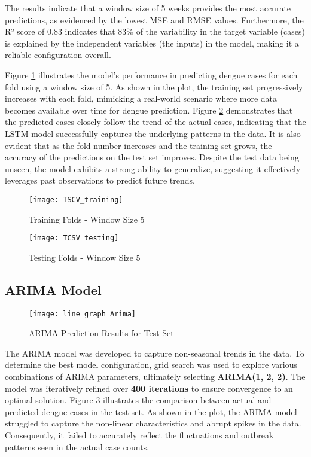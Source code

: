 The results indicate that a window size of 5 weeks provides the most accurate predictions, as evidenced by the lowest MSE and RMSE values. Furthermore, the R² score of 0.83 indicates that 83\% of the variability in the target variable (cases) is explained by the independent variables (the inputs) in the model, making it a reliable configuration overall.

Figure \ref{fig:tcsv_training} illustrates the model’s performance in predicting dengue cases for each fold using a window size of 5. As shown in the plot, the training set progressively increases with each fold, mimicking a real-world scenario where more data becomes available over time for dengue prediction. Figure \ref{fig:tcsv_testing} demonstrates that the predicted cases closely follow the trend of the actual cases, indicating that the LSTM model successfully captures the underlying patterns in the data. It is also evident that as the fold number increases and the training set grows, the accuracy of the predictions on the test set improves. Despite the test data being unseen, the model exhibits a strong ability to generalize, suggesting it effectively leverages past observations to predict future trends.

\begin{figure}[H]
	\centering
	\texttt{[image: TSCV\_training]}
	\caption{Training Folds - Window Size 5}
	\label{fig:tcsv_training}
\end{figure}

\begin{figure}[H]
	\centering
	\texttt{[image: TCSV\_testing]}
	\caption{Testing Folds - Window Size 5}
	\label{fig:tcsv_testing}
\end{figure}

\subsection{ARIMA Model}



\begin{figure}[H]
	\centering
	\texttt{[image: line\_graph\_Arima]}
	\caption{ARIMA Prediction Results for Test Set}
	\label{fig:Arima_result}
\end{figure}

The ARIMA model was developed to capture non-seasonal trends in the data. To determine the best model configuration, grid search was used to explore various combinations of ARIMA parameters, ultimately selecting \textbf{ARIMA(1, 2, 2)}. The model was iteratively refined over \textbf{400 iterations} to ensure convergence to an optimal solution. Figure \ref{fig:Arima_result} illustrates the comparison between actual and predicted dengue cases in the test set. As shown in the plot, the ARIMA model struggled to capture the non-linear characteristics and abrupt spikes in the data. Consequently, it failed to accurately reflect the fluctuations and outbreak patterns seen in the actual case counts.

